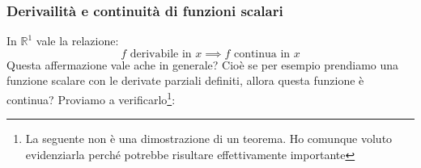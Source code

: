\subsubsection{Derivailità e continuità di funzioni scalari}
In $\mathbb{R}^1$ vale la relazione:
\begin{equation*}
	f \text{ derivabile in } x \implies f \text{ continua in } x
\end{equation*}
Questa affermazione vale ache in generale? Cioè se per esempio prendiamo una funzione scalare con le derivate parziali definiti, allora questa funzione è continua? Proviamo a verificarlo\footnote{La seguente non è una dimostrazione di un teorema. Ho comunque voluto evidenziarla perché potrebbe risultare effettivamente importante}:
